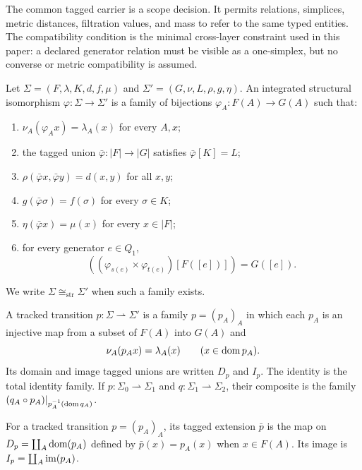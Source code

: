 The common tagged carrier is a scope decision. It permits relations, simplices,
metric distances, filtration values, and mass to refer to the same typed
entities. The compatibility condition is the minimal cross-layer constraint
used in this paper: a declared generator relation must be visible as a
one-simplex, but no converse or metric compatibility is assumed.

\begin{definition}
Let $\Sigma=(F,\lambda,K,d,f,\mu)$ and
$\Sigma'=(G,\nu,L,\rho,g,\eta)$. An integrated structural isomorphism
$\varphi:\Sigma\to\Sigma'$ is a family of bijections
$\varphi_A:F(A)\to G(A)$ such that:
\begin{enumerate}
\item $\nu_A(\varphi_Ax)=\lambda_A(x)$ for every $A,x$;
\item the tagged union $\bar\varphi:|F|\to|G|$ satisfies
$\bar\varphi[K]=L$;
\item $\rho(\bar\varphi x,\bar\varphi y)=d(x,y)$ for all $x,y$;
\item $g(\bar\varphi\sigma)=f(\sigma)$ for every $\sigma\in K$;
\item $\eta(\bar\varphi x)=\mu(x)$ for every $x\in|F|$;
\item for every generator $e\in Q_1$,
\[
((\varphi_{s(e)}\times\varphi_{t(e)})[F([e])])=G([e]).
\]
\end{enumerate}
We write $\Sigma\cong_{\mathrm{str}}\Sigma'$ when such a family exists.
\end{definition}

\begin{definition}
A tracked transition $p:\Sigma\rightharpoonup\Sigma'$ is a family
$p=(p_A)_A$ in which each $p_A$ is an injective map from a subset of $F(A)$
into $G(A)$ and
\[
\nu_A(p_Ax)=\lambda_A(x)\qquad(x\in\operatorname{dom} p_A).
\]
Its domain and image tagged unions are written $D_p$ and $I_p$. The identity is
the total identity family. If
$p:\Sigma_0\rightharpoonup\Sigma_1$ and
$q:\Sigma_1\rightharpoonup\Sigma_2$, their composite is the family
$(q_A\circ p_A)|_{p_A^{-1}(\operatorname{dom} q_A)}$.
\end{definition}

\begin{definition}
For a tracked transition $p=(p_A)_A$, its tagged extension $\bar p$ is the
map on $D_p=\coprod_A\operatorname{dom}(p_A)$ defined by $\bar p(x)=p_A(x)$ when
$x\in F(A)$. Its image is $I_p=\coprod_A\operatorname{im}(p_A)$.
\end{definition}

